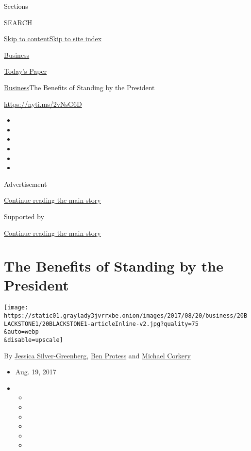 Sections

SEARCH

\protect\hyperlink{site-content}{Skip to
content}\protect\hyperlink{site-index}{Skip to site index}

\href{https://www.nytimes3xbfgragh.onion/section/business}{Business}

\href{https://myaccount.nytimes3xbfgragh.onion/auth/login?response_type=cookie\&client_id=vi}{}

\href{https://www.nytimes3xbfgragh.onion/section/todayspaper}{Today's
Paper}

\href{/section/business}{Business}\textbar{}The Benefits of Standing by
the President

\url{https://nyti.ms/2vNsG6D}

\begin{itemize}
\item
\item
\item
\item
\item
\item
\end{itemize}

Advertisement

\protect\hyperlink{after-top}{Continue reading the main story}

Supported by

\protect\hyperlink{after-sponsor}{Continue reading the main story}

\hypertarget{the-benefits-of-standing-by-the-president}{%
\section{The Benefits of Standing by the
President}\label{the-benefits-of-standing-by-the-president}}

\texttt{[image: https://static01.graylady3jvrrxbe.onion/images/2017/08/20/business/20BLACKSTONE1/20BLACKSTONE1-articleInline-v2.jpg?quality=75\\\&auto=webp\\\&disable=upscale]}

By
\href{http://www.nytimes3xbfgragh.onion/by/jessica-silver-greenberg}{Jessica
Silver-Greenberg},
\href{http://www.nytimes3xbfgragh.onion/by/ben-protess}{Ben Protess} and
\href{http://www.nytimes3xbfgragh.onion/by/michael-corkery}{Michael
Corkery}

\begin{itemize}
\item
  Aug. 19, 2017
\item
  \begin{itemize}
  \item
  \item
  \item
  \item
  \item
  \item
  \end{itemize}
\end{itemize}

